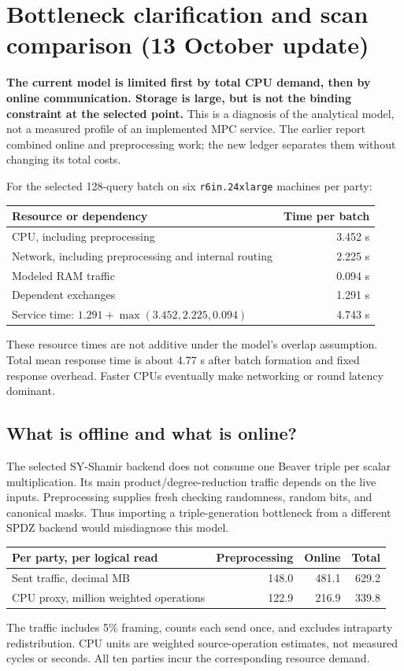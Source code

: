 
\clearpage
\section{Bottleneck clarification and scan comparison (13 October update)}
\label{sec:bottleneck}
\textbf{The current model is limited first by total CPU demand, then by online
communication. Storage is large, but is not the binding constraint at the selected
point.} This is a diagnosis of the analytical model, not a measured profile of an
implemented MPC service. The earlier report combined online and preprocessing
work; the new ledger separates them without changing its total costs.

For the selected 128-query batch on six \texttt{r6in.24xlarge} machines per party:
\begin{center}\begin{tabular}{lr}\toprule
Resource or dependency & Time per batch\\\midrule
CPU, including preprocessing & 3.452 s\\
Network, including preprocessing and internal routing & 2.225 s\\
Modeled RAM traffic & 0.094 s\\
Dependent exchanges & 1.291 s\\\midrule
Service time: $1.291+\max(3.452,2.225,0.094)$ & 4.743 s\\
\bottomrule\end{tabular}\end{center}
These resource times are not additive under the model's overlap assumption.
Total mean response time is about 4.77 s after batch formation and fixed response
overhead. Faster CPUs eventually make networking or round latency dominant.

\subsection{What is offline and what is online?}
The selected SY-Shamir backend does not consume one Beaver triple per scalar
multiplication. Its main product/degree-reduction traffic depends on the live
inputs. Preprocessing supplies fresh checking randomness, random bits, and
canonical masks. Thus importing a triple-generation bottleneck from a different
SPDZ backend would misdiagnose this model.

\begin{center}\begin{tabular}{lrrr}\toprule
Per party, per logical read & Preprocessing & Online & Total\\\midrule
Sent traffic, decimal MB & 148.0 & 481.1 & 629.2\\
CPU proxy, million weighted operations & 122.9 & 216.9 & 339.8\\
\bottomrule\end{tabular}\end{center}
The traffic includes 5\% framing, counts each send once, and excludes intraparty
redistribution. CPU units are weighted source-operation estimates, not measured
cycles or seconds. All ten parties incur the corresponding resource demand.


